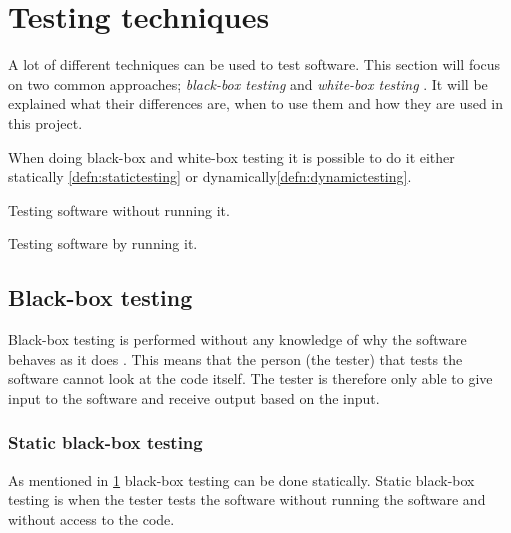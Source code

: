 \section{Testing techniques} \label{sec:testingtechniques}
A lot of different techniques can be used to test software.
This section will focus on two common approaches; \textit{black-box testing} and \textit{white-box testing} \cite{SoftwareTesting}.
It will be explained what their differences are, when to use them and how they are used in this project.

When doing black-box and white-box testing it is possible to do it either statically \cref{defn:statictesting} or dynamically\cref{defn:dynamictesting}.

\begin{defn} \label{defn:statictesting}
Testing software without running it.
\end{defn}

\begin{defn} \label{defn:dynamictesting}
Testing software by running it.
\end{defn}

\subsection{Black-box testing} \label{sec:blackboxtesting}
Black-box testing is performed without any knowledge of why the software behaves as it does \cite{SoftwareTesting}.
This means that the person (the tester) that tests the software cannot look at the code itself.
The tester is therefore only able to give input to the software and receive output based on the input.

\subsubsection{Static black-box testing}
As mentioned in \cref{sec:testingtechniques} black-box testing can be done statically.
Static black-box testing is when the tester tests the software without running the software and without access to the code.

